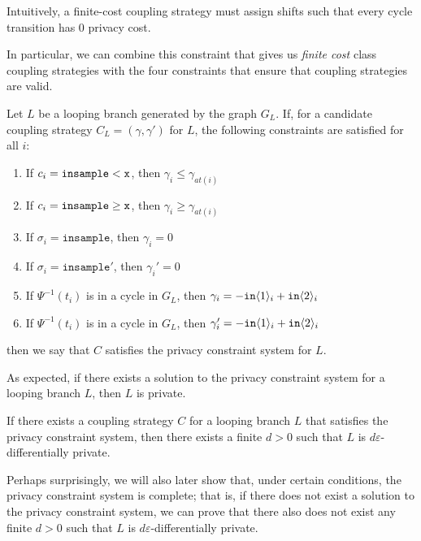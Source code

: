 Intuitively, a finite-cost coupling strategy must assign shifts such that every cycle transition has 0 privacy cost. 

In particular, we can combine this constraint that gives us \textit{finite cost} class coupling strategies with the four constraints that ensure that coupling strategies are valid.

\begin{defn}\label{privacyConstraintSystem}
    Let $L$ be a looping branch generated by the graph $G_L$. If, for a candidate coupling strategy $C_L = (\gamma, \gamma')$ for $L$, the following constraints are satisfied for all $i$: \begin{enumerate}
        \item If $c_i = \lguard[\texttt{x}]$, then $\gamma_i\leq\gamma_{at(i)}$
        \item If $c_i = \gguard[\texttt{x}]$, then $\gamma_i\geq\gamma_{at(i)}$
        \item If $\sigma_i = \texttt{insample}$, then $\gamma_i=0$
        \item If $\sigma_i = \texttt{insample}'$, then $\gamma_i'=0$
        \item If $\Psi^{-1}(t_i)$ is in a cycle in $G_L$, then $\gamma_i = -\texttt{in}\brangle{1}_i+\texttt{in}\brangle{2}_i$
        \item If $\Psi^{-1}(t_i)$ is in a cycle in $G_L$, then $\gamma_i' = -\texttt{in}\brangle{1}_i+\texttt{in}\brangle{2}_i$
    \end{enumerate}
    then we say that $C$ satisfies the privacy constraint system for $L$. 
\end{defn}

As expected, if there exists a solution to the privacy constraint system for a looping branch $L$, then $L$ is private.

\begin{prop}\label{privacyFiniteCostProp}
    If there exists a coupling strategy $C$ for a looping branch $L$ that satisfies the privacy constraint system, then there exists a finite $d>0$ such that $L$ is $d\varepsilon$-differentially private. 
\end{prop}

Perhaps surprisingly, we will also later show that, under certain conditions, the privacy constraint system is complete; that is, if there does not exist a solution to the privacy constraint system, we can prove that there also does not exist any finite $d>0$ such that $L$ is $d\varepsilon$-differentially private. 